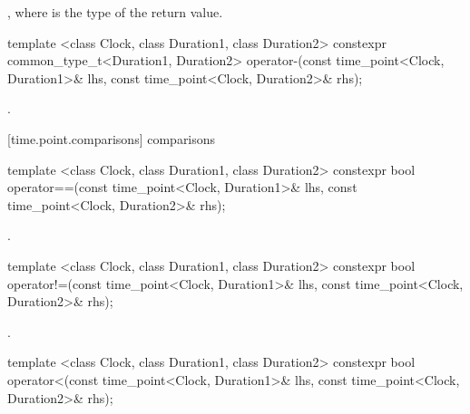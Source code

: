 \begin{itemdescr}
\pnum
\returns {},
where  is the type of the return value.
\end{itemdescr}

%
\begin{itemdecl}
template <class Clock, class Duration1, class Duration2>
  constexpr common_type_t<Duration1, Duration2>
  operator-(const time_point<Clock, Duration1>& lhs, const time_point<Clock, Duration2>& rhs);
\end{itemdecl}

\begin{itemdescr}
\pnum
\returns {}.
\end{itemdescr}

[time.point.comparisons]{ comparisons}

%
\begin{itemdecl}
template <class Clock, class Duration1, class Duration2>
  constexpr bool operator==(const time_point<Clock, Duration1>& lhs,
                            const time_point<Clock, Duration2>& rhs);
\end{itemdecl}

\begin{itemdescr}
\pnum
\returns {}.
\end{itemdescr}

%
\begin{itemdecl}
template <class Clock, class Duration1, class Duration2>
  constexpr bool operator!=(const time_point<Clock, Duration1>& lhs,
                            const time_point<Clock, Duration2>& rhs);
\end{itemdecl}

\begin{itemdescr}
\pnum
\returns {}.
\end{itemdescr}

%
\begin{itemdecl}
template <class Clock, class Duration1, class Duration2>
  constexpr bool operator<(const time_point<Clock, Duration1>& lhs,
                           const time_point<Clock, Duration2>& rhs);
\end{itemdecl}

